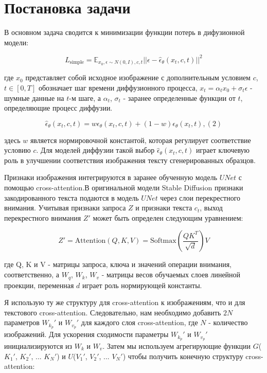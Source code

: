 \documentclass{article}
\begin{document}
\section{Постановка задачи}

В основном задача сводится к минимизации функции потерь в дифузионной модели:

\[
L_{\text{simple}} = \mathbb{E}_{x_0, \epsilon \sim N(0, I), c, t} ||\epsilon - \hat{\epsilon}_{\theta}(x_t, c, t) ||^2 
\]

где \(x_0\) представляет собой исходное изображение с дополнительным условием \(c\), \(t \in [0, T]\) обозначает шаг времени диффузионного процесса, \(x_t = \alpha_t x_0 + \sigma_t \epsilon\) - шумные данные на \(t\)-м шаге, а \(\alpha_t\), \(\sigma_t\) - заранее определенные функции от \(t\), определяющие процесс диффузии.

\[
\hat{\epsilon}_{\theta}(x_t, c, t) = w\epsilon_{\theta}(x_t, c, t) + (1 - w)\epsilon_{\theta}(x_t, t), (2)
\]

здесь \(w\) является нормировочной константой, которая регулирует соответствие условию \(c\). Для моделей диффузии такой выбор \(\hat{\epsilon}_{\theta}(x_t, c, t)\) играет ключевую роль в улучшении соответствия изображения тексту сгенерированных образцов.

Признаки изображения интегрируются в заранее обученную модель \(UNet\) с помощью cross-attention.В оригинальной модели Stable Diffusion признаки закодированного текста подаются в модель \(UNet\) через слои перекрестного внимания. Учитывая признаки запроса \(Z\) и признаки текста \(c_t\), выход перекрестного внимания \(Z'\) может быть определен следующим уравнением:

\[ Z' = \text{Attention}(Q, K, V) = \text{Softmax}\left(\frac{QK^T}{\sqrt{d}}\right)V\]


где Q, K и V - матрицы запроса, ключа и значений операции внимания, соответственно, а \(W_q\), \(W_k\), \(W_v\) - матрицы весов обучаемых слоев линейной проекции, переменная \(d\) играет роль нормирующей константы.

Я использую ту же структуру для cross-attention к изображениям, что и для текстового cross-attention. Следовательно, нам необходимо добавить \(2N\) параметров \(W_k_p'\) и \(W_v_p'\) для каждого слоя cross-attention, где \(N\) - количество изображений. Для ускорения сходимости параметры \(W_k_p'\) и \(W_v_p'\) инициализируются из \(W_k\) и \(W_v\). Затем мы используем агрегирующие функции \(G\)(\(K_1'\), \(K_2'\), ... \(K_N'\)) 
и \(U\)(\(V_1'\), \(V_2'\), ... \(V_N'\)) чтобы получить конечную структуру cross-attention:
\end{document}

